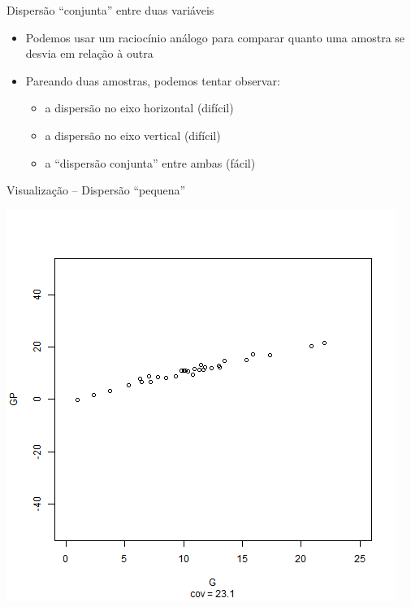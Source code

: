 \documentclass{beamer}
\begin{document}
\begin{frame}{\scriptsize Dispersão ``conjunta'' entre duas variáveis}
  \small
  \begin{itemize}
    \footnotesize
  \item Podemos usar um raciocínio análogo para comparar quanto uma
    amostra se desvia \alert{em relação à outra}

    \bigskip
    \bigskip
  \item Pareando duas amostras, podemos tentar observar:
    \begin{itemize}
      \scriptsize
    \item a dispersão no eixo horizontal (difícil)
    \item a dispersão no eixo vertical (difícil)
      \medskip
      \footnotesize
    \item a ``dispersão conjunta'' entre ambas (fácil)
    \end{itemize}
  \end{itemize}
\end{frame}

\begin{frame}{\scriptsize Visualização -- Dispersão ``pequena''}
  \begin{center}
    \includegraphics[height=.8\textheight]{Cap17/anim-1}
  \end{center}
\end{frame}
\end{document}
